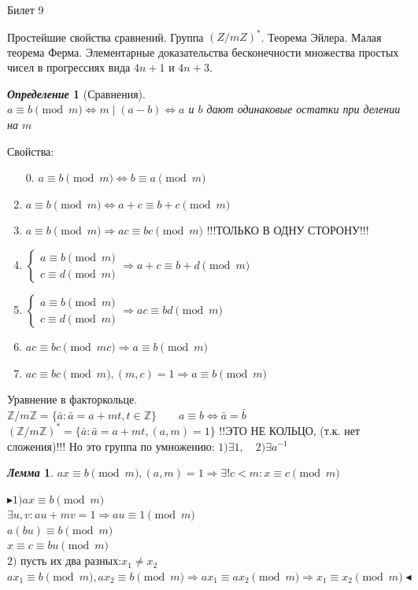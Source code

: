 \documentclass[a4paper,12pt]{article}
\newtheorem{deff}{\textit{Определение}}
\newtheorem{lem}{\textit{Лемма}}
\newcommand{\ee}{\equiv}
\newcommand{\q}{\quad}
\newcommand{\pb}{\blacktriangleright}
\newcommand{\pe}{\blacktriangleleft}
\newcommand{\Ra}{\Rightarrow}
\newcommand{\bb}[1]{\mathbb{#1}}
\newcommand{\os}{\left(}
\newcommand{\cs}{\right)}
\begin{document}
\newpage
\begin{mybox}{\hypertarget{bil9}{Билет 9}}

\begin{formbox}{}
Простейшие свойства сравнений. Группа $\os Z/mZ \cs ^*$. Теорема Эйлера. Малая теорема Ферма. Элементарные доказательства бесконечности множества простых чисел в прогрессиях вида $4n+1$ и $4n+3$.
\end{formbox}
\begin{formbox}{}
\begin{deff}[Сравнения]\q\\
$a \ee b \pmod{m}\iff m\mid (a-b) \iff a$ и $b$ дают одинаковые остатки при делении на $m$
\end{deff}
\end{formbox}
Свойства:
\begin{enumerate}
\item[0.] $a \ee b \pmod{m}\iff b \ee a \pmod{m}$
\item $a \ee b \pmod{m}\iff a + c \ee b + c\pmod{m}$
\item $a \ee b \pmod{m}\Ra ac \ee bc \pmod{m}$ !!!ТОЛЬКО В ОДНУ СТОРОНУ!!!
\item $\begin{cases} a \ee b \pmod{m}\\ c\ee d\pmod{m}\end{cases} \Ra a+c\ee b + d\pmod{m}$
\item $\begin{cases} a \ee b \pmod{m}\\ c\ee d\pmod{m}\end{cases} \Ra ac\ee bd\pmod{m}$
\item $ac\ee bc\pmod{mc}\Ra a\ee b\pmod{m}$
\item $ac\ee bc\pmod{m}, (m,c) = 1\Ra a\ee b\pmod{m}$
\end{enumerate}
Уравнение в факторкольце.\\
$\bb{Z}/m\bb{Z} = \{\bar{a}: \bar{a} = a + mt, t\in\bb{Z}\} \q\q a\ee b \iff \bar{a} = \bar{b}$\\
$\os \bb{Z}/m\bb{Z}  \cs^* = \{\bar{a}: \bar{a} = a + mt, (a,m) = 1\}$ !!ЭТО НЕ КОЛЬЦО, (т.к. нет сложения)!!! Но это группа по умножению: $1) \exists 1,\q 2) \exists a^{-1}$

\begin{formbox}{}
\begin{lem} $ax\ee b\pmod{m}, (a,m) = 1\Ra \exists!c<m:x\ee c\pmod{m}$
\end{lem}
\end{formbox}
$\pb 1) ax\ee b\pmod{m} $\\
$\exists u,v: au+mv = 1\Ra au \ee 1 \pmod{m} $\\
$a(bu) \ee b\pmod{m}$\\
$x\ee c\ee bu\pmod{m}$\\
$2)$ пусть их два разных:$x_1\not= x_2$\\
$ax_1\ee b\pmod{m}, ax_2\ee b\pmod{m}\Ra ax_1 \ee ax_2\pmod{m}\Ra x_1\ee x_2\pmod{m}\pe$


\end{mybox}
\end{document}
